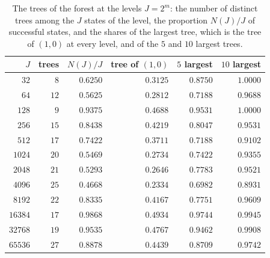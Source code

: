 \documentclass[11pt]{amsart}
\theoremstyle{definition}
\begin{document}
\begin{table}[H]
\centering
\caption{The trees of the forest at the levels $J=2^m$: the number of distinct trees among the $J$ states of the level, the proportion $N(J)/J$ of successful states, and the shares of the largest tree, which is the tree of $(1,0)$ at every level, and of the $5$ and $10$ largest trees.}
\label{tab:trees}
\begin{tabular}{rrrrrr}
\toprule
$J$ & trees & $N(J)/J$ & tree of $(1,0)$ & $5$ largest & $10$ largest\\
\midrule
$32$ & $8$ & $0.6250$ & $0.3125$ & $0.8750$ & $1.0000$\\
$64$ & $12$ & $0.5625$ & $0.2812$ & $0.7188$ & $0.9688$\\
$128$ & $9$ & $0.9375$ & $0.4688$ & $0.9531$ & $1.0000$\\
$256$ & $15$ & $0.8438$ & $0.4219$ & $0.8047$ & $0.9531$\\
$512$ & $17$ & $0.7422$ & $0.3711$ & $0.7188$ & $0.9102$\\
$1024$ & $20$ & $0.5469$ & $0.2734$ & $0.7422$ & $0.9355$\\
$2048$ & $21$ & $0.5293$ & $0.2646$ & $0.7783$ & $0.9521$\\
$4096$ & $25$ & $0.4668$ & $0.2334$ & $0.6982$ & $0.8931$\\
$8192$ & $22$ & $0.8335$ & $0.4167$ & $0.7751$ & $0.9609$\\
$16384$ & $17$ & $0.9868$ & $0.4934$ & $0.9744$ & $0.9945$\\
$32768$ & $19$ & $0.9535$ & $0.4767$ & $0.9462$ & $0.9908$\\
$65536$ & $27$ & $0.8878$ & $0.4439$ & $0.8709$ & $0.9742$\\
\bottomrule
\end{tabular}
\end{table}
\end{document}

